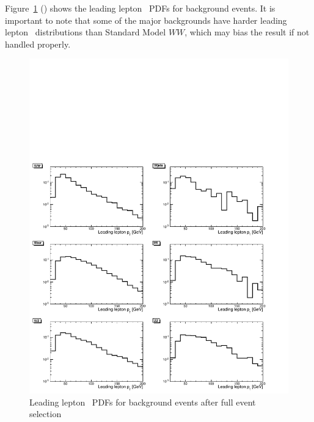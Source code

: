 Figure~\ref{fig:bkgpdfs} () shows the leading lepton \pt\ PDFs
for background events. It is important to note that some of the major
backgrounds have harder leading lepton \pt\ distributions than Standard
Model $WW$, which may bias the result if not handled properly.

\begin{figure}[tp]
  \centerline{
    \includegraphics[width=1.0\textwidth]{figures/pdf_mc_all.pdf}
  }

  \caption[Background PDFs] {Leading lepton \pt\ PDFs for background events after full event selection}
  \label{fig:bkgpdfs}
\end{figure}

